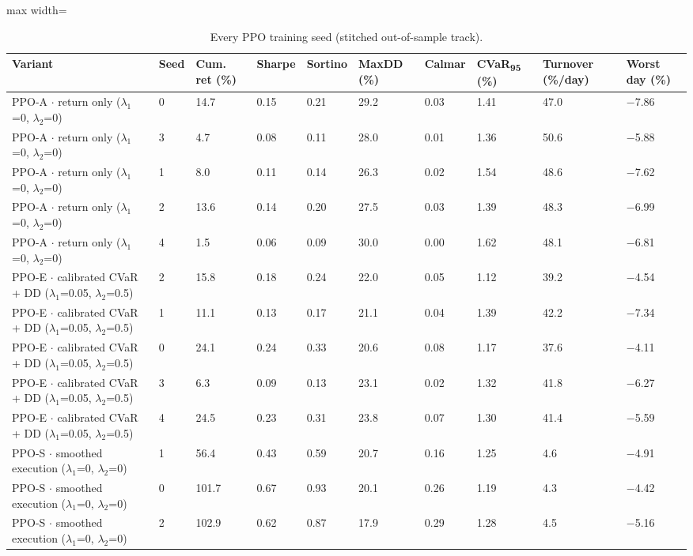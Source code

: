\documentclass[11pt]{article}
\begin{document}
\begin{table}[!htbp]
\centering\scriptsize
\caption{Every PPO training seed (stitched out-of-sample track).\label{tab-seeds-no}}
\begin{adjustbox}{max width=\linewidth}
\begin{tabular}{@{}llllllllll@{}}
\toprule
Variant & Seed & Cum. ret (\%) & Sharpe & Sortino & MaxDD (\%) & Calmar & CVaR\textsubscript{95} (\%) & Turnover (\%/day) & Worst day (\%) \\
\midrule
PPO-A $\cdot$ return only {($\lambda_1$=0, $\lambda_2$=0)} & 0 & 14.7 & 0.15 & 0.21 & 29.2 & 0.03 & 1.41 & 47.0 & $-$7.86 \\
PPO-A $\cdot$ return only {($\lambda_1$=0, $\lambda_2$=0)} & 3 & 4.7 & 0.08 & 0.11 & 28.0 & 0.01 & 1.36 & 50.6 & $-$5.88 \\
PPO-A $\cdot$ return only {($\lambda_1$=0, $\lambda_2$=0)} & 1 & 8.0 & 0.11 & 0.14 & 26.3 & 0.02 & 1.54 & 48.6 & $-$7.62 \\
PPO-A $\cdot$ return only {($\lambda_1$=0, $\lambda_2$=0)} & 2 & 13.6 & 0.14 & 0.20 & 27.5 & 0.03 & 1.39 & 48.3 & $-$6.99 \\
PPO-A $\cdot$ return only {($\lambda_1$=0, $\lambda_2$=0)} & 4 & 1.5 & 0.06 & 0.09 & 30.0 & 0.00 & 1.62 & 48.1 & $-$6.81 \\
PPO-E $\cdot$ calibrated CVaR + DD {($\lambda_1$=0.05, $\lambda_2$=0.5)} & 2 & 15.8 & 0.18 & 0.24 & 22.0 & 0.05 & 1.12 & 39.2 & $-$4.54 \\
PPO-E $\cdot$ calibrated CVaR + DD {($\lambda_1$=0.05, $\lambda_2$=0.5)} & 1 & 11.1 & 0.13 & 0.17 & 21.1 & 0.04 & 1.39 & 42.2 & $-$7.34 \\
PPO-E $\cdot$ calibrated CVaR + DD {($\lambda_1$=0.05, $\lambda_2$=0.5)} & 0 & 24.1 & 0.24 & 0.33 & 20.6 & 0.08 & 1.17 & 37.6 & $-$4.11 \\
PPO-E $\cdot$ calibrated CVaR + DD {($\lambda_1$=0.05, $\lambda_2$=0.5)} & 3 & 6.3 & 0.09 & 0.13 & 23.1 & 0.02 & 1.32 & 41.8 & $-$6.27 \\
PPO-E $\cdot$ calibrated CVaR + DD {($\lambda_1$=0.05, $\lambda_2$=0.5)} & 4 & 24.5 & 0.23 & 0.31 & 23.8 & 0.07 & 1.30 & 41.4 & $-$5.59 \\
PPO-S $\cdot$ smoothed execution {($\lambda_1$=0, $\lambda_2$=0)} & 1 & 56.4 & 0.43 & 0.59 & 20.7 & 0.16 & 1.25 & 4.6 & $-$4.91 \\
PPO-S $\cdot$ smoothed execution {($\lambda_1$=0, $\lambda_2$=0)} & 0 & 101.7 & 0.67 & 0.93 & 20.1 & 0.26 & 1.19 & 4.3 & $-$4.42 \\
PPO-S $\cdot$ smoothed execution {($\lambda_1$=0, $\lambda_2$=0)} & 2 & 102.9 & 0.62 & 0.87 & 17.9 & 0.29 & 1.28 & 4.5 & $-$5.16 \\

\end{tabular}
\end{adjustbox}
\end{table}
\end{document}
